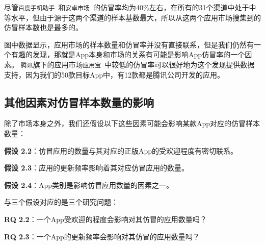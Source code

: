 尽管\texttt{百度手机助手}~\cite{Baiduappstore}和\texttt{安卓市场}~\cite{Hiapk}的仿冒率均为40\%左右，在所有的31个渠道中处于中等水平，但由于源于这两个渠道的样本基数最大，所以从这两个应用市场搜集到的仿冒样本数也是最多的。

图中数据显示，应用市场的样本数量和仿冒率并没有直接联系，但是我们仍然有一个有趣的发现，那就是App本身和市场的关系有可能是影响App仿冒率的一个因素。
\texttt{腾讯}旗下的应用市场\texttt{应用宝}~\cite{Myapp}中较低的仿冒率可以很好地为这个发现提供数据支持，因为我们的50款目标App中，有12款都是腾讯公司开发的应用。

\subsection{其他因素对仿冒样本数量的影响}
除了市场本身之外，我们还假设以下这些因素可能会影响某款App对应的仿冒样本数量：

{\bf 假设 2.2}：仿冒应用的数量与其对应的正版App的受欢迎程度有密切联系。

{\bf 假设 2.3}：应用的更新频率影响着其对应仿冒应用的数量。

{\bf 假设 2.4}：App类别是影响仿冒应用数量的因素之一。

与三个假设对应的是三个研究问题：

{\bf RQ 2.2}：一个App受欢迎的程度会影响对其仿冒的应用数量吗？

{\bf RQ 2.3}：一个App的更新频率会影响对其仿冒的应用数量吗？

